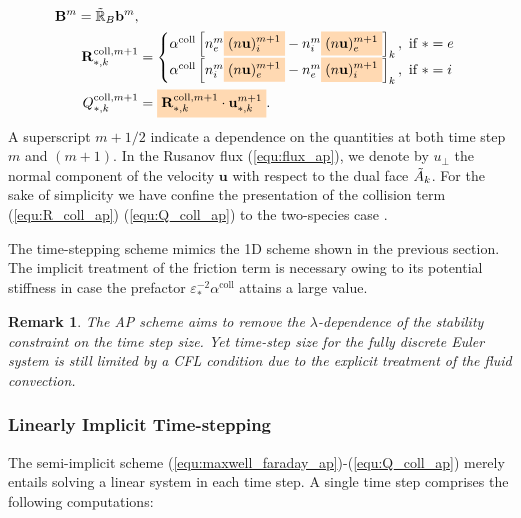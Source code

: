 \documentclass{article}
\newtheorem*{remark}{Remark}
\newcommand{\mycolorbox}[2]{\colorbox{#1}{$\displaystyle#2$}}
\begin{document}
\begin{subequations}
\begin{align}
    \ \ \ \ 
    \mathbf{B}^{m} = \Tilde{\mathbb{R}}_B\mathbf{b}^{m}, \\
    \mathbf{R}_{*,k}^{\text{coll},m+1} &= 
    \begin{cases}
    \alpha^\text{coll}\left[n_{e}^m\mycolorbox{orange!30}{(n\mathbf{u})^{m+1}_{i}} - n_{i}^m\mycolorbox{orange!30}{(n\mathbf{u})^{m+1}_{e}}\right]_k, \text{   if   } * = e \\
    \alpha^\text{coll}\left[n_{i}^m\mycolorbox{orange!30}{(n\mathbf{u})^{m+1}_{e}} - n_{e}^m\mycolorbox{orange!30}{(n\mathbf{u})^{m+1}_{i}}\right]_k, \text{   if   } * = i
    \end{cases}  \label{equ:R_coll_ap}\\
    Q_{*,k}^{\text{coll},m+1} &= \mycolorbox{orange!30}{\mathbf{R}_{*,k}^{\text{coll},m+1} \cdot \mathbf{u}_{\ast,k}^{m+1}} \label{equ:Q_coll_ap}
.\end{align}
\end{subequations}
A superscript $m+1/2$ indicate a dependence on the quantities at both time step $m$ and
$(m+1)$. In the Rusanov flux (\ref{equ:flux_ap}), we denote by $u_\perp$ the normal
component of the velocity $\mathbf{u}$ with respect to the dual face $\Tilde{A}_k$. For
the sake of simplicity we have confine the presentation of the collision term
(\ref{equ:R_coll_ap}) (\ref{equ:Q_coll_ap}) to the two-species case .

The time-stepping scheme mimics the 1D scheme shown in the previous section. The
implicit treatment of the friction term is necessary owing to its potential stiffness in
case the prefactor $\varepsilon^{-2}_*\alpha^\text{coll}$ attains a large value. 

\begin{remark}
  The AP scheme aims to remove the $\lambda$-dependence of the stability constraint on the
  time step size. Yet time-step size for the fully discrete Euler system is still limited
  by a CFL condition due to the explicit treatment of the fluid convection.
\end{remark}

\subsubsection{Linearly Implicit Time-stepping}

The semi-implicit scheme (\ref{equ:maxwell_faraday_ap})-(\ref{equ:Q_coll_ap}) merely entails
solving a linear system in each time step. A single time step comprises the following
computations:
\medskip
\end{document}
